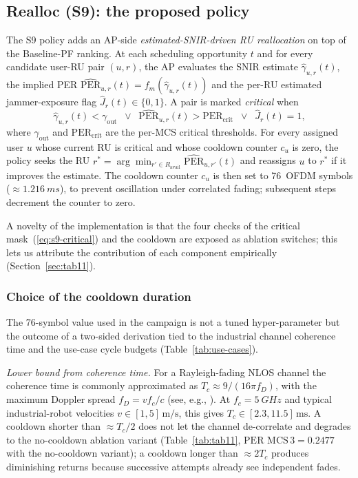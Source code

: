 \documentclass[journal,onecolumn,11pt,a4paper]{IEEEtran}
\newcommand{\percrit}{\mathrm{PER}_{\mathrm{crit}}}
\newcommand{\gout}{\gamma_{\mathrm{out}}}
\newcommand{\snirhat}[2]{\hat\gamma_{#1,#2}(t)}
\newcommand{\jhat}[1]{\hat{J}_{#1}(t)}
\newcommand{\perhat}[2]{\widehat{\mathrm{PER}}_{#1,#2}(t)}
\begin{document}
\subsection{Realloc (S9): the proposed policy}
\label{sec:s9-spec}

The S9 policy adds an AP-side \emph{estimated-SNIR-driven RU
reallocation} on top of the Baseline-PF ranking. At each scheduling
opportunity $t$ and for every candidate user-RU pair $(u,r)$, the AP
evaluates the SNIR estimate $\snirhat{u}{r}$, the implied PER
$\perhat{u}{r} = f_m(\snirhat{u}{r})$ and the per-RU estimated
jammer-exposure flag $\jhat{r} \in \{0,1\}$. A pair is marked
\emph{critical} when
\begin{equation}
  \snirhat{u}{r} < \gout \;\;\vee\;\;
  \perhat{u}{r} > \percrit \;\;\vee\;\; \jhat{r} = 1,
  \label{eq:s9-critical}
\end{equation}
where $\gout$ and $\percrit$ are the per-MCS critical thresholds. For
every assigned user $u$ whose current RU is critical and whose
cooldown counter $c_u$ is zero, the policy seeks the RU
$r^* = \arg\min_{r' \in R_{\mathrm{avail}}} \perhat{u}{r'}$ and
reassigns $u$ to $r^*$ if it improves the estimate. The cooldown
counter $c_u$ is then set to \SI{76}{}~OFDM symbols
($\approx\SI{1.216}{ms}$), to prevent oscillation under correlated
fading; subsequent steps decrement the counter to zero.

A novelty of the implementation is that the four checks of the
critical mask~(\ref{eq:s9-critical}) and the cooldown are exposed as
ablation switches; this lets us attribute the contribution of each
component empirically (Section~\ref{sec:tab11}).

\subsubsection{Choice of the cooldown duration}
\label{sec:s9-cooldown-choice}

The \SI{76}{}-symbol value used in the campaign is not a tuned
hyper-parameter but the outcome of a two-sided derivation tied to
the industrial channel coherence time and the use-case cycle
budgets (Table~\ref{tab:use-cases}).

\emph{Lower bound from coherence time.} For a Rayleigh-fading
NLOS channel the coherence time is commonly approximated as
$T_c \approx 9/(16\pi f_D)$, with the maximum Doppler spread
$f_D = v f_c / c$ (see, e.g., \cite{Rap02}). At $f_c = \SI{5}{GHz}$
and typical industrial-robot velocities $v \in [1,5]\,\mathrm{m/s}$,
this gives $T_c \in [2.3, 11.5]\,\mathrm{ms}$. A cooldown
shorter than $\approx T_c/2$ does not let the channel
de-correlate and degrades to the no-cooldown ablation variant
(Table~\ref{tab:tab11}, $\mathrm{PER}\,\,\mathrm{MCS}\,3 = 0.2477$
with the no-cooldown variant); a cooldown longer than
$\approx 2T_c$ produces diminishing returns because successive
attempts already see independent fades.
\end{document}
